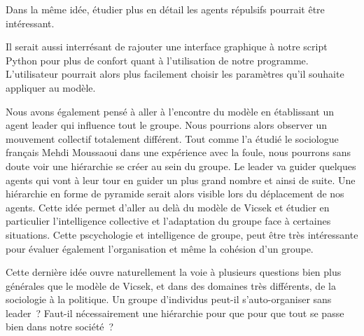\documentclass[french, a4paper, 12pt]{article}
\begin{document}
	Dans la même idée, étudier plus en détail les agents répulsifs pourrait être intéressant.
	
	Il serait aussi interrésant de rajouter une interface graphique à notre script Python pour plus de confort quant à l'utilisation de notre programme. L'utilisateur pourrait alors plus facilement choisir les paramètres qu'il souhaite appliquer au modèle.
	
	Nous avons également pensé à aller à l'encontre du modèle en établissant un agent leader qui influence tout le groupe. Nous pourrions alors observer un mouvement collectif totalement différent. Tout comme l'a étudié le sociologue français Mehdi Moussaoui dans une expérience avec la foule, nous pourrons sans doute voir une hiérarchie se créer au sein du groupe. Le leader va guider quelques agents qui vont à leur tour en guider un plus grand nombre et ainsi de suite. Une hiérarchie en forme de pyramide serait alors visible lors du déplacement de nos agents. Cette idée permet d'aller au delà du modèle de Vicsek et étudier en particulier l'intelligence collective et l'adaptation du groupe face à certaines situations. Cette pscychologie et intelligence de groupe, peut être très intéressante pour évaluer également l'organisation et même la cohésion d'un groupe.
	
	Cette dernière idée ouvre naturellement la voie à plusieurs questions bien plus générales que le modèle de Vicsek, et dans des domaines très différents, de la sociologie à la politique. Un groupe d'individus peut-il s'auto-organiser sans leader~? Faut-il nécessairement une hiérarchie pour que pour que tout se passe bien dans notre société~?   
       



   
\end{document}
